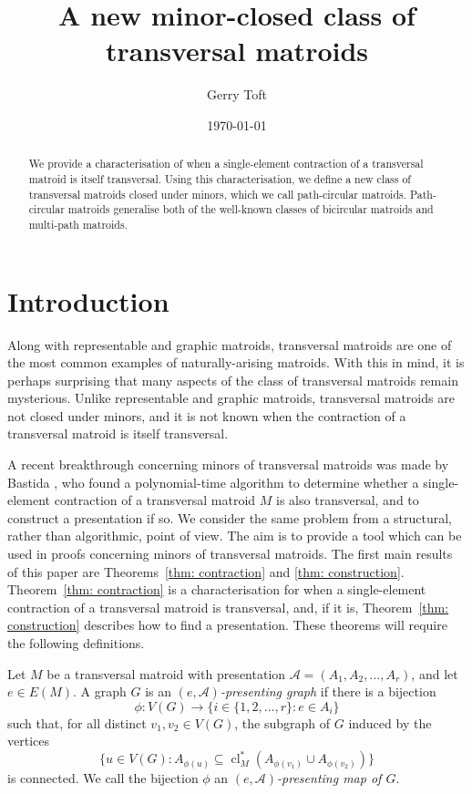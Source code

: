 \documentclass[11pt, reqno]{amsart}
\title{A new minor-closed class of transversal matroids}
\author[G.\ Toft]{Gerry Toft}
\date{\today}
\DeclareMathOperator{\cl}{cl}
\begin{document}
\begin{abstract}
We provide a characterisation of when a single-element contraction of a transversal matroid is itself transversal. Using this characterisation, we define a new class of transversal matroids closed under minors, which we call path-circular matroids. Path-circular matroids generalise both of the well-known classes of bicircular matroids and multi-path matroids.
\end{abstract}

\maketitle

\section{Introduction}

Along with representable and graphic matroids, transversal matroids are one of the most common examples of naturally-arising matroids. With this in mind, it is perhaps surprising that many aspects of the class of transversal matroids remain mysterious. Unlike representable and graphic matroids, transversal matroids are not closed under minors, and it is not known when the contraction of a transversal matroid is itself transversal.

A recent breakthrough concerning minors of transversal matroids was made by Bastida \cite{bas24}, who found a polynomial-time algorithm to determine whether a single-element contraction of a transversal matroid $M$ is  also transversal, and to construct a presentation if so. We consider the same problem from a structural, rather than algorithmic, point of view. The aim is to provide a tool which can be used in proofs concerning minors of transversal matroids. The first main results of this paper are Theorems~\ref{thm: contraction} and \ref{thm: construction}. Theorem~\ref{thm: contraction} is a characterisation for when a single-element contraction of a transversal matroid is transversal, and, if it is, Theorem~\ref{thm: construction} describes how to find a presentation. These theorems will require the following definitions.

Let $M$ be a transversal matroid with presentation $\mathcal A = (A_1, A_2, \ldots, A_r)$, and let $e \in E(M)$. A graph $G$ is an \emph{$(e, \mathcal A)$-presenting graph} if there is a bijection 
$$
\phi : V(G) \rightarrow \{i \in \{1,2,\ldots,r\} : e \in A_i\}
$$ 
such that, for all distinct $v_1, v_2 \in V(G)$, the subgraph of $G$ induced by the vertices
$$
\{u \in V(G) : A_{\phi(u)} \subseteq \cl_M^*(A_{\phi(v_1)} \cup A_{\phi(v_2)})\}
$$
is connected. We call the bijection $\phi$ an \emph{$(e, \mathcal A)$-presenting map of $G$}.
\end{document}
